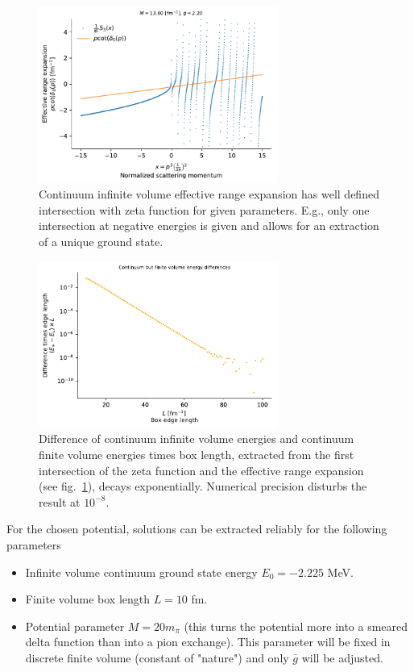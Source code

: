 \documentclass[
    aps,
    prl,
    showkeys,
    nofootinbib,
    floatfix
]{revtex4-1}
\begin{document}
\begin{figure}[!htb]
\includegraphics[width=0.7\textwidth]{figs/pcotdelta-intersection.pdf}
\caption{
	\label{fig:pcotdelta-intersection}
	Continuum infinite volume effective range expansion has well defined intersection with zeta function for given parameters.
	E.g., only one intersection at negative energies is given and allows for an extraction of a unique ground state.
}
\end{figure}


\begin{figure}[!htb]
\includegraphics[width=0.7\textwidth]{figs/finite-volume-energy-difference.pdf}
\caption{
	\label{fig:finite-volume-energy-difference}
	Difference of continuum infinite volume energies and continuum finite volume energies times box length, extracted from the first intersection of the zeta function and the effective range expansion (see fig.~\ref{fig:pcotdelta-intersection}), decays exponentially.
	Numerical precision disturbs the result at $10^{-8}$.
}
\end{figure}

For the chosen potential, solutions can be extracted reliably for the following parameters
\begin{itemize}
	\item Infinite volume continuum ground state energy $E_0 = - 2.225$ MeV.
	\item Finite volume box length $L = 10$ fm.
	\item Potential parameter $M = 20 m_\pi$ (this turns the potential more into a smeared delta function than into a pion exchange).
		This parameter will be fixed in discrete finite volume (constant of "nature") and only $\bar g$ will be adjusted.
\end{itemize}
\end{document}
